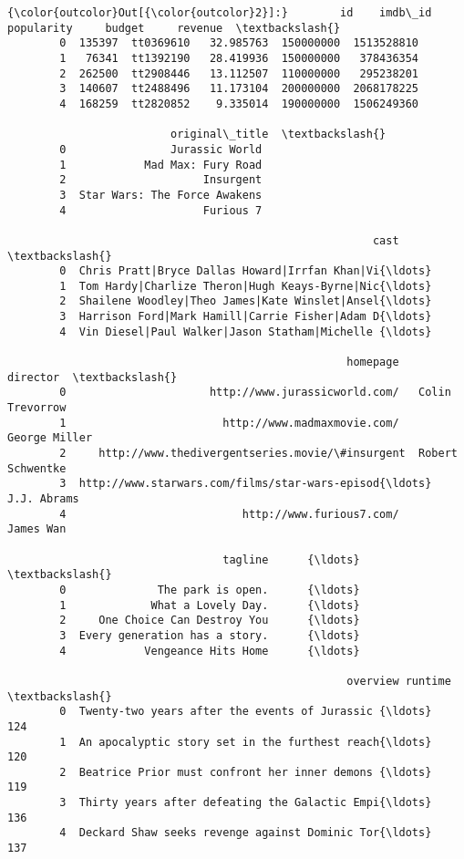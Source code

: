 \documentclass[11pt]{article}
\begin{document}
\begin{Verbatim}[commandchars=\\\{\}]
{\color{outcolor}Out[{\color{outcolor}2}]:}        id    imdb\_id  popularity     budget     revenue  \textbackslash{}
        0  135397  tt0369610   32.985763  150000000  1513528810   
        1   76341  tt1392190   28.419936  150000000   378436354   
        2  262500  tt2908446   13.112507  110000000   295238201   
        3  140607  tt2488496   11.173104  200000000  2068178225   
        4  168259  tt2820852    9.335014  190000000  1506249360   
        
                         original\_title  \textbackslash{}
        0                Jurassic World   
        1            Mad Max: Fury Road   
        2                     Insurgent   
        3  Star Wars: The Force Awakens   
        4                     Furious 7   
        
                                                        cast  \textbackslash{}
        0  Chris Pratt|Bryce Dallas Howard|Irrfan Khan|Vi{\ldots}   
        1  Tom Hardy|Charlize Theron|Hugh Keays-Byrne|Nic{\ldots}   
        2  Shailene Woodley|Theo James|Kate Winslet|Ansel{\ldots}   
        3  Harrison Ford|Mark Hamill|Carrie Fisher|Adam D{\ldots}   
        4  Vin Diesel|Paul Walker|Jason Statham|Michelle {\ldots}   
        
                                                    homepage          director  \textbackslash{}
        0                      http://www.jurassicworld.com/   Colin Trevorrow   
        1                        http://www.madmaxmovie.com/     George Miller   
        2     http://www.thedivergentseries.movie/\#insurgent  Robert Schwentke   
        3  http://www.starwars.com/films/star-wars-episod{\ldots}       J.J. Abrams   
        4                           http://www.furious7.com/         James Wan   
        
                                 tagline      {\ldots}       \textbackslash{}
        0              The park is open.      {\ldots}        
        1             What a Lovely Day.      {\ldots}        
        2     One Choice Can Destroy You      {\ldots}        
        3  Every generation has a story.      {\ldots}        
        4            Vengeance Hits Home      {\ldots}        
        
                                                    overview runtime  \textbackslash{}
        0  Twenty-two years after the events of Jurassic {\ldots}     124   
        1  An apocalyptic story set in the furthest reach{\ldots}     120   
        2  Beatrice Prior must confront her inner demons {\ldots}     119   
        3  Thirty years after defeating the Galactic Empi{\ldots}     136   
        4  Deckard Shaw seeks revenge against Dominic Tor{\ldots}     137   
        

\end{Verbatim}
\end{document}
